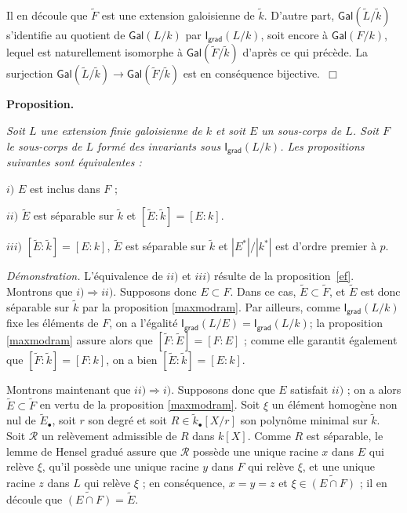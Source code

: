 \documentclass[10pt,leqno]{article}
\renewcommand{\cal}{\mathscr}
\newcommand{\red}{\widetilde}
\newcommand{\gred}[1]{\widetilde{#1}_{\bullet}}
\newcommand{\deux}[1]{\refstepcounter{subsection}\label{#1}\medskip\noindent {\bf (\thesubsection)}\hspace{.1cm}}
\begin{document}
\medskip
Il en découle que $\red{F}$ est une extension galoisienne de $\red{k}$. D'autre part, $\mathsf{Gal}({\red{L}/\red{k}})$ s'identifie au quotient de $\mathsf {Gal}(L/k)$ par $\mathsf{I}_{\mathsf {grad}}(L/k)$, soit encore à $\mathsf{Gal}(F/k)$, lequel est naturellement isomorphe à $\mathsf{Gal}(\red{F}/\red{k})$ d'après ce qui précède. La surjection $\mathsf{Gal}(\red{L}/\red{k})\to\mathsf{Gal}(\red{F}/\red{k})$ est en conséquence bijective.~$\Box$ 

\medskip



\medskip
\deux{extmodram} {\bf Proposition.} {\em Soit $L$ une extension finie galoisienne de $k$ et soit $E$ un sous-corps de $L$. Soit $F$ le sous-corps de $L$ formé des invariants sous $\mathsf{I}_{\mathsf {grad}}(L/k)$. Les propositions suivantes sont équivalentes :

\medskip
$i)$ $E$ est inclus dans $F$ ;

\medskip
$ii)$ $\red{E}$ est séparable sur $\red{k}$ et $[\red{E}:\red{k}]=[E:k]$.

\medskip
$iii)$ $[\red{E}:\red{k}]=[E:k]$, $\red{E}$ est séparable sur $\red{k}$ et $|E^{*}|/|k^{*}|$ est d'ordre premier à $p$.}



\medskip
{\em Démonstration.} L'équivalence de $ii)$ et $iii)$ résulte de la proposition~\ref{ef}. Montrons que $i)\Rightarrow ii)$. Supposons donc $E\subset F$. Dans ce cas, $\red{E}\subset \red{F}$, et $\red{E}$ est donc séparable sur $\red{k}$ par la proposition \ref{maxmodram}. Par ailleurs, comme $\mathsf{I}_{\mathsf {grad}}(L/k)$ fixe les éléments de $F$, on a l'égalité $\mathsf{I}_{\mathsf {grad}}(L/E)=\mathsf{I}_{\mathsf {grad}}(L/k)$; la proposition \ref{maxmodram} assure alors que $[\red{F}:\red{E}]=[F:E]$ ; comme  elle garantit également que $[\red{F}:\red{k}]=[F:k]$, on a bien $[\red{E}:\red{k}]=[E:k]$.

\medskip
Montrons maintenant que $ii)\Rightarrow i)$. Supposons donc que $E$ satisfait $ii)$ ; on a alors $\red E\subset \red F$ en vertu de la proposition \ref{maxmodram}. Soit $\xi$ un élément homogène non nul de $\gred{E}$, soit $r$ son degré et soit $R\in \gred{k}[X/r]$ son polynôme minimal sur $\red{k}$. Soit $\cal R$ un relèvement admissible de $R$ dans $k[X]$. Comme $R$ est séparable, le lemme de Hensel gradué assure que ${\cal R}$ possède une unique racine $x$ dans $E$ qui relève $\xi$, qu'il possède une unique racine $y$ dans $F$ qui relève $\xi$, et une unique racine $z$ dans $L$ qui relève $\xi$ ; en conséquence, $x=y=z$ et $\xi \in \red{(E\cap F)}$ ; il en découle que $\red{(E\cap F)}=\red{E}$.
\end{document}
